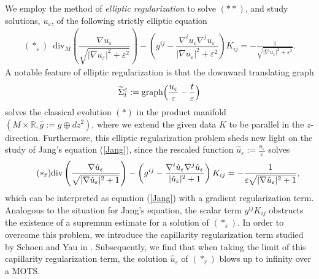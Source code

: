 \documentclass[11pt]{amsart}
\DeclareMathOperator{\graph}{graph} \DeclareMathOperator{\closure}{Closure}
\def\wt{\widetilde}
\begin{document}
We employ the method of \textit{elliptic regularization} to solve $(**)$, and study solutions, $u_{\varepsilon}$,  of the following strictly elliptic equation 
\begin{align*}{(*_{\varepsilon})}\,\,\, \text{div}_M\left(\dfrac{\nabla u_{\varepsilon}}{\sqrt{|\nabla u_{\varepsilon}|^2+\varepsilon^2}}\right)-\left(g^{ij}-\dfrac{\nabla^iu_{\varepsilon}\nabla^ju_{\varepsilon}}{|\nabla u_{\varepsilon}|^2+\varepsilon^2}\right)K_{ij}=-\frac{1}{\sqrt{|\nabla u_{\varepsilon}|^2+\varepsilon^2}}.
\end{align*}
A notable feature of elliptic regularization is that the downward translating graph 
 \begin{equation}\label{translating}
\wt\Sigma^{\varepsilon}_t:=\graph\Bigl(\dfrac{u_{\varepsilon}}{\varepsilon}-\frac{t}{\varepsilon}\Bigr)
\end{equation}
solves the classical evolution $(*)$ in the product manifold $(M\times\mathbb{R},\bar{g}:=g\oplus dz^2)$, where we extend the given data $K$ to be parallel in the $z$-direction. Furthermore, this elliptic regularization problem sheds new light on the study of Jang's equation (\ref{Jang}), since the rescaled function $\hat{u}_{\varepsilon}:=\frac {u_{\varepsilon}}{{\varepsilon}}$ solves 
\[\tag{$*_{\hat{\varepsilon}}$}
\mbox{div}\left(\dfrac{\nabla \hat{u}_{\varepsilon}}{\sqrt{|\nabla \hat{u}_{\varepsilon}|^2+1}}\right)-\left(g^{ij}-\dfrac{\nabla^i\hat{u}_{\varepsilon}\nabla^j\hat{u}_{\varepsilon}}{|\hat{u}_{\varepsilon}|^2+1}\right)K_{ij}=-\dfrac{1}{\varepsilon\sqrt{|\nabla \hat{u}_{\varepsilon}|^2+1}},
\]
which can be interpreted as equation (\ref{Jang}) with a gradient regularization term. Analogous to the situation for Jang's equation, the scalar term $g^{ij}K_{ij}$ obstructs the existence of a supremum estimate for a solution of $(*_{\hat \varepsilon})$. In order to overcome this problem, we introduce the capillarity regularization term studied by Schoen and Yau in \cite{SY81}. Subsequently, we find that when taking the limit of this capillarity regularization term, the solution $\hat{u}_{\varepsilon}$ of $(*_{\hat{\varepsilon}})$ blows up to infinity over a MOTS. 

\end{document}
